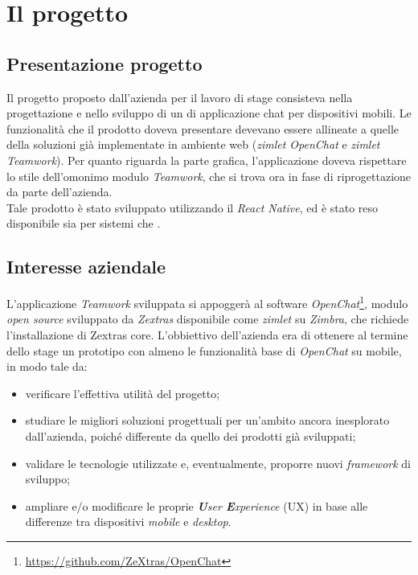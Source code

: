 
\chapter{Il progetto}\label{chap:project}
\section{Presentazione progetto}
Il progetto proposto dall'azienda per il lavoro di stage consisteva nella progettazione e nello sviluppo di un  di applicazione chat per dispositivi mobili. Le funzionalità che il prodotto doveva presentare devevano essere allineate a quelle della soluzioni già implementate in ambiente web (\emph{zimlet OpenChat} e \emph{zimlet Teamwork}). Per quanto riguarda la parte grafica, l'applicazione doveva rispettare lo stile dell'omonimo modulo \emph{Teamwork}, che si trova ora in fase di riprogettazione da parte dell'azienda. \\
Tale prodotto è stato sviluppato utilizzando il  \emph{React Native}, ed è stato reso disponibile sia per sistemi  che .

\section{Interesse aziendale} \label{sec:intaz}
L'applicazione \emph{Teamwork} sviluppata si appoggerà al software \emph{OpenChat}\footnote{\url{https://github.com/ZeXtras/OpenChat}}, modulo \emph{open source} sviluppato da \emph{Zextras} disponibile come \emph{zimlet} su \emph{Zimbra}, che richiede l'installazione di Zextras core.
L'obbiettivo dell'azienda era di ottenere al termine dello stage un prototipo con almeno le funzionalità base di \emph{OpenChat} su mobile, in modo tale da:
\begin{itemize}
	\item verificare l'effettiva utilità del progetto;
	\item studiare le migliori soluzioni progettuali per un'ambito ancora inesplorato dall'azienda, poiché differente da quello dei prodotti già sviluppati;
	\item validare le tecnologie utilizzate e, eventualmente, proporre nuovi \emph{framework} di sviluppo;
	\item ampliare e/o modificare le proprie \emph{\textbf{U}ser \textbf{E}xperience} (\acrshort{UX})  in base alle differenze tra dispositivi \emph{mobile} e \emph{desktop}.
\end{itemize}


